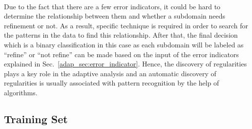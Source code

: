 \paragraph{}
Due to the fact that there are a few error indicators, it could be hard to determine the relationship between them and whether a subdomain needs refinement or not.
As a result, specific technique is required in order to search for the patterns in the data to find this relationship.
After that, the final decision which is a binary classification in this case as each subdomain will be labeled as ``refine'' or ``not refine'' can be made based on the input of the error indicators explained in Sec.~\ref{adap_sec:error_indicator}.
Hence, the discovery of regularities plays a key role in the adaptive analysis and an automatic discovery of regularities is usually associated with pattern recognition by the help of algorithms.

\subsection{Training Set}
